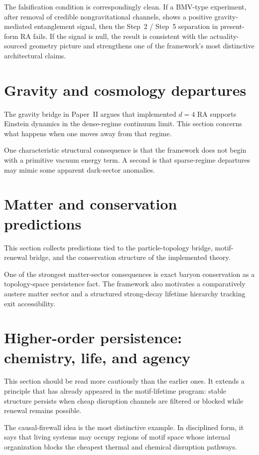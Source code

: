 \documentclass[11pt]{article}
\begin{document}
The falsification condition is correspondingly clean. If a BMV-type experiment, after removal of credible nongravitational channels, shows a positive gravity-mediated entanglement signal, then the Step~2 / Step~5 separation in present-form RA fails. If the signal is null, the result is consistent with the actuality-sourced geometry picture and strengthens one of the framework's most distinctive architectural claims.


\section{Gravity and cosmology departures}
The gravity bridge in Paper~II argues that implemented $d=4$ RA supports Einstein dynamics in the dense-regime continuum limit. This section concerns what happens when one moves away from that regime.

One characteristic structural consequence is that the framework does not begin with a primitive vacuum energy term. A second is that sparse-regime departures may mimic some apparent dark-sector anomalies.

\section{Matter and conservation predictions}
This section collects predictions tied to the particle-topology bridge, motif-renewal bridge, and the conservation structure of the implemented theory.

One of the strongest matter-sector consequences is exact baryon conservation as a topology-space persistence fact. The framework also motivates a comparatively austere matter sector and a structured strong-decay lifetime hierarchy tracking exit accessibility.

\section{Higher-order persistence: chemistry, life, and agency}
This section should be read more cautiously than the earlier ones. It extends a principle that has already appeared in the motif-lifetime program: stable structure persists when cheap disruption channels are filtered or blocked while renewal remains possible.

The causal-firewall idea is the most distinctive example. In disciplined form, it says that living systems may occupy regions of motif space whose internal organization blocks the cheapest thermal and chemical disruption pathways.
\end{document}
